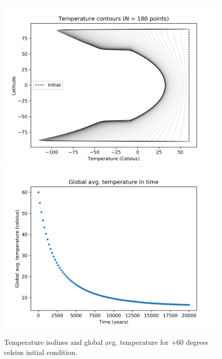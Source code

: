 \documentclass{article}
\begin{document}
\begin{figure}
\includegraphics[scale=0.7]{tcont_q4c.png} 
\includegraphics[scale=0.7]{tavg_q4c.png}
\caption{Temperature isolines and global avg. temperature for +60 degrees celsius initial condition.}
\end{figure}
\end{document}
